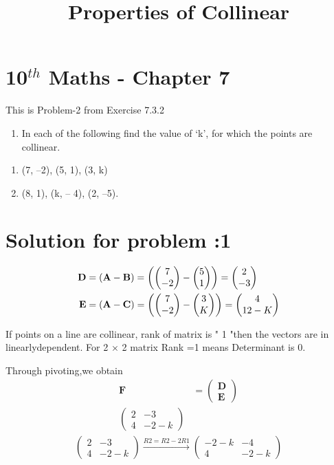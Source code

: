 \documentclass[12pt]{article}
\providecommand{\brak}[1]{\ensuremath{\left(#1\right)}}
\newcommand{\myvec}[1]{\ensuremath{\begin{pmatrix}#1\end{pmatrix}}}
\let\vec\mathbf
\begin{document}
\begin{center}
\title{\textbf{Properties of Collinear}}
\date{\vspace{-5ex}} %
\maketitle
\end{center}

\setcounter{page}{1}

\section{10$^{th}$ Maths - Chapter 7}

This is Problem-2 from Exercise 7.3.2

\begin{enumerate}
\item In each of the following find the value of ‘k’, for which the points are collinear.
\end{enumerate}
\begin{enumerate}
\item (7, –2), (5, 1), (3, k) \\
\item (8, 1), (k, – 4), (2, –5).\\
\end{enumerate}
\section{Solution for problem :1}
\begin{align}
\vec{D} &=\brak{\vec{A}-\vec{B}} = \brak{\myvec{7 \\-2 } - \myvec{5 \\1 } } = \myvec{2 \\ -3 }\\
\vec{E} &= \brak{\vec{A}-\vec{C}} = \brak{\myvec{7 \\ -2 } - \myvec{3 \\K } } = \myvec{4 \\1\-2-K}
\end{align}

If  points on a line  are  collinear, rank of matrix is " 1 "then the vectors are in linearlydependent.
For 2 × 2 matrix Rank =1 means Determinant is 0.

Through pivoting,we obtain
\begin{align}
\vec{F} &={\myvec{\vec{D}\\ \vec{E}}}\\
\begin{pmatrix}
2 & -3 \\
4 & -2-k 
\end{pmatrix}
\end{align}
\begin{align}
\begin{pmatrix}
2 & -3 \\ 
 4& -2-k
\end{pmatrix}\overset{R2=R2-2R1}{\rightarrow}
\begin{pmatrix}
-2-k &-4 \\ 
 4& -2-k
\end{pmatrix}
\end{align}
\end{document}
